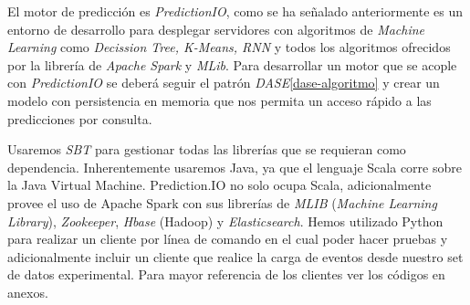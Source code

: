 El motor de predicción es \emph{PredictionIO}, como se ha señalado anteriormente  es un entorno de desarrollo para desplegar servidores con algoritmos de \emph{Machine Learning} como  \emph{Decission Tree, K-Means, RNN} y todos los algoritmos ofrecidos por la librería de \emph{Apache Spark} y \emph{MLib}. Para desarrollar un motor que se acople con \emph{PredictionIO} se deberá seguir el patrón \emph{DASE}\ref{dase-algoritmo} y crear un modelo con persistencia en memoria que nos permita un acceso rápido a las predicciones por consulta.


Usaremos \emph{SBT} para gestionar todas las librerías que se requieran como dependencia. Inherentemente usaremos Java, ya que el lenguaje Scala corre sobre la {Java Virtual Machine}. {Prediction.IO} no solo ocupa {Scala}, adicionalmente provee el uso de {Apache Spark} con sus librerías de \emph{MLIB} (\emph{Machine Learning Library}), \emph{Zookeeper}, \emph{Hbase} (Hadoop) y \emph{Elasticsearch}. Hemos utilizado Python para realizar un cliente por línea de comando en el cual poder hacer pruebas y adicionalmente incluir un cliente que realice la carga de eventos desde nuestro set de datos experimental. Para mayor referencia de los clientes ver los códigos en anexos.











